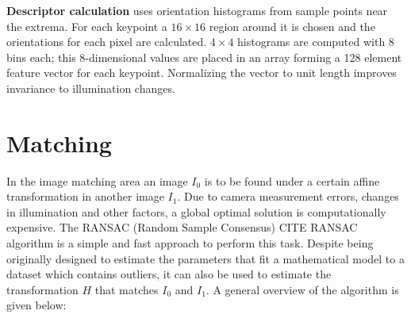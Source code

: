 \documentclass[12pt]{article}
\begin{document}
\textbf{Descriptor calculation} uses orientation histograms from sample points near the extrema.
For each keypoint a $16 \times 16$ region around it is chosen and the orientations for each pixel are calculated.
$4 \times 4$ histograms are computed with 8 bins each; this 8-dimensional values are placed in an array forming a 128 element feature vector for each keypoint.
Normalizing the vector to unit length improves invariance to illumination changes.


\FloatBarrier %
\section{Matching}

In the image matching area an image $I_0$ is to be found under a certain affine transformation in another image $I_1$.
Due to camera measurement errors, changes in illumination and other factors, a global optimal solution is computationally expensive.
The RANSAC (Random Sample Consensus) CITE RANSAC algorithm is a simple and fast approach to perform this task.
Despite being originally designed to estimate the parameters that fit a mathematical model to a dataset which contains outliers, it can also be used to estimate the transformation $H$ that matches $I_0$ and $I_1$.
A general overview of the algorithm is given below:
\end{document}
